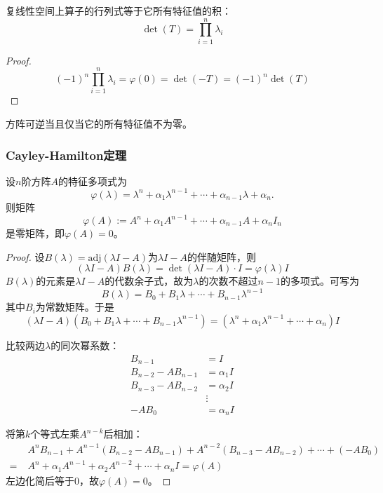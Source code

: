 \begin{theorem}
复线性空间上算子的行列式等于它所有特征值的积：
\[
\det(T) = \prod_{i=1}^{n}\lambda_i
\]
\end{theorem}

\begin{proof}
\[
(-1)^n\prod_{i=1}^{n}\lambda_i = \varphi(0) = \det(-T) = (-1)^n\det(T)
\]
\end{proof}

\begin{corollary}
方阵可逆当且仅当它的所有特征值不为零。
\end{corollary}

\subsubsection{Cayley-Hamilton定理}

\begin{theorem}
设$n$阶方阵$A$的特征多项式为
\[
\varphi(\lambda) = \lambda^n + \alpha_1\lambda^{n-1} + \cdots + \alpha_{n-1}\lambda + \alpha_n.
\]
则矩阵
\[
\varphi(A) := A^n + \alpha_1 A^{n-1} + \cdots + \alpha_{n-1}A + \alpha_n I_n
\]
是零矩阵，即$\varphi(A) = 0$。
\end{theorem}

\begin{proof}
设$B(\lambda) = \text{adj}(\lambda I - A)$为$\lambda I - A$的伴随矩阵，则
\[
(\lambda I - A)B(\lambda) = \det(\lambda I - A) \cdot I = \varphi(\lambda)I
\]
$B(\lambda)$的元素是$\lambda I - A$的代数余子式，故为$\lambda$的次数不超过$n-1$的多项式。可写为
\[
B(\lambda) = B_0 + B_1\lambda + \cdots + B_{n-1}\lambda^{n-1}
\]
其中$B_i$为常数矩阵。于是
\[
(\lambda I - A)(B_0 + B_1\lambda + \cdots + B_{n-1}\lambda^{n-1}) = (\lambda^n + \alpha_1\lambda^{n-1} + \cdots + \alpha_n)I
\]

比较两边$\lambda$的同次幂系数：
\begin{align*}
B_{n-1} &= I \\
B_{n-2} - AB_{n-1} &= \alpha_1 I \\
B_{n-3} - AB_{n-2} &= \alpha_2 I \\
&\vdots \\
-AB_0 &= \alpha_n I
\end{align*}

将第$k$个等式左乘$A^{n-k}$后相加：
\begin{align*}
& A^n B_{n-1} + A^{n-1}(B_{n-2} - AB_{n-1}) + A^{n-2}(B_{n-3} - AB_{n-2}) + \cdots + (-AB_0) \\
=\;& A^n + \alpha_1 A^{n-1} + \alpha_2 A^{n-2} + \cdots + \alpha_n I = \varphi(A)
\end{align*}
左边化简后等于$0$，故$\varphi(A) = 0$。
\end{proof}

